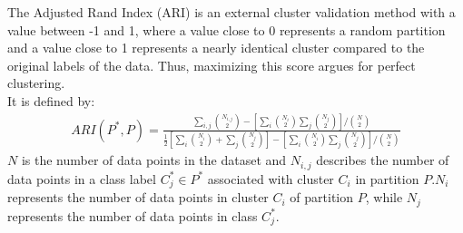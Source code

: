 The Adjusted Rand Index (ARI) is an external cluster validation method with a value between -1 and 1, where a value close to 0 represents a random partition and a value close to 1 represents a nearly identical cluster compared to the original labels of the data. Thus, maximizing this score argues for perfect clustering.\\
It is defined by: \cite{ari}
\begin{align}
    ARI(P^*,P) = \frac{\sum_{i,j}\binom{N_{i,j}}{2}-[\sum_{i}\binom{N_{i}}{2}\sum_{j}\binom{N_{j}}{2}]/\binom{N}{2}}{\frac{1}{2}[\sum_{i}\binom{N_{i}}{2}+\sum_{j}\binom{N_{j}}{2}]-[\sum_{i}\binom{N_{i}}{2}\sum_{j}\binom{N_{j}}{2}]/\binom{N}{2}}
\end{align}
$N$ is the number of data points in the dataset and $N_{i,j}$ describes the number of data points in a class label $C_j^* \in P^*$ associated with cluster $C_i$ in partition $P$.$N_i$ represents the number of data points in cluster $C_i$ of partition $P$, while $N_j$ represents the number of data points in class $C_j^*$. \cite{ari}